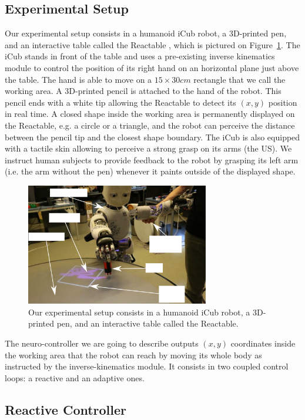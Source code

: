 \documentclass[letterpaper, 10 pt, conference]{ieeeconf}  %
\begin{document}
\subsection{Experimental Setup}
\label{sec:setup}
Our experimental setup consists in a humanoid iCub robot, a 3D-printed pen, and an interactive table called the Reactable \cite{jorda2008stage}, which is pictured on Figure~\ref{fig:setup}. The iCub stands in front of the table and uses a pre-existing inverse kinematics module to control the position of its right hand on an horizontal plane just above the table. The hand is able to move on a $15 \times 30 cm$ rectangle that we call the working area. A 3D-printed pencil is attached to the hand of the robot. This pencil ends with a white tip allowing the Reactable to detect its $(x, y)$ position in real time. A closed shape inside the working area is permanently displayed on the Reactable, e.g. a circle or a triangle, and the robot can perceive the distance between the pencil tip and the closest shape boundary. The iCub is also equipped with a tactile skin allowing to perceive a strong grasp on its arms (the US). We instruct human subjects to provide feedback to the robot by grasping its left arm (i.e. the arm without the pen) whenever it paints outside of the displayed shape.


\begin{figure}[!t]
\centering
\includegraphics[width=8cm]{setup}
\caption{Our experimental setup consists in a humanoid iCub robot, a 3D-printed pen, and an interactive table called the Reactable.}
\label{fig:setup}
\end{figure}

The neuro-controller we are going to describe outputs $(x, y)$ coordinates inside the working area that the robot can reach by moving its whole body as instructed by the inverse-kinematics module. It consists in two coupled control loops: a reactive and an adaptive ones.

\subsection{Reactive Controller}
\end{document}
